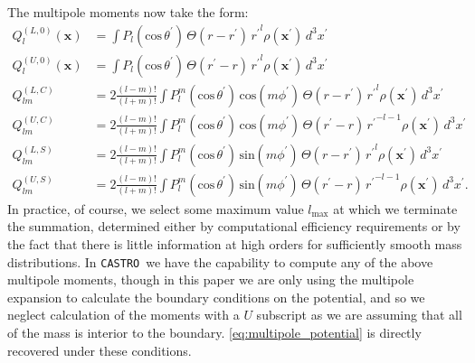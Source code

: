\documentclass[iop]{../emulateapj}
\newcommand{\castro}{\texttt{CASTRO}}
\begin{document}
The multipole moments now take the form:
\begin{align}
  Q_l^{(L,0)}(\mathbf{x}) &= \int P_l(\text{cos}\, \theta^\prime)\, \Theta(r - r^\prime)\, {r^{\prime}}^l \rho(\mathbf{x}^\prime)\, d^3 x^\prime \\
  Q_l^{(U,0)}(\mathbf{x}) &= \int P_l(\text{cos}\, \theta^\prime)\, \Theta(r^\prime - r)\, {r^{\prime}}^l \rho(\mathbf{x}^\prime)\, d^3 x^\prime \\  
  Q_{lm}^{(L,C)} &= 2\frac{(l-m)!}{(l+m)!} \int P_{l}^{m}(\text{cos}\, \theta^\prime)\, \text{cos}(m\phi^\prime)\, \Theta(r - r^\prime)\, {r^\prime}^l \rho(\mathbf{x}^\prime)\, d^3 x^\prime \\
  Q_{lm}^{(U,C)} &= 2\frac{(l-m)!}{(l+m)!} \int P_{l}^{m}(\text{cos}\, \theta^\prime)\, \text{cos}(m\phi^\prime)\, \Theta(r^\prime - r)\, {r^\prime}^{-l-1} \rho(\mathbf{x}^\prime)\, d^3 x^\prime \\
  Q_{lm}^{(L,S)} &= 2\frac{(l-m)!}{(l+m)!} \int P_{l}^{m}(\text{cos}\, \theta^\prime)\, \text{sin}(m\phi^\prime)\, \Theta(r - r^\prime)\, {r^\prime}^l \rho(\mathbf{x}^\prime)\, d^3 x^\prime \\
  Q_{lm}^{(U,S)} &= 2\frac{(l-m)!}{(l+m)!} \int P_{l}^{m}(\text{cos}\, \theta^\prime)\, \text{sin}(m\phi^\prime)\, \Theta(r^\prime - r)\, {r^\prime}^{-l-1} \rho(\mathbf{x}^\prime)\, d^3 x^\prime.  
\end{align}
In practice, of course, we select some maximum value $l_{\text{max}}$ at which we terminate the summation, determined either by computational efficiency requirements or by the fact that there is little information at high orders for sufficiently smooth mass distributions. In \castro\ we have the capability to compute any of the above multipole moments, though in this paper we are only using the multipole expansion to calculate the boundary conditions on the potential, and so we neglect calculation of the moments with a $U$ subscript as we are assuming that all of the mass is interior to the boundary. \autoref{eq:multipole_potential} is directly recovered under these conditions.

\clearpage




\clearpage
\end{document}
